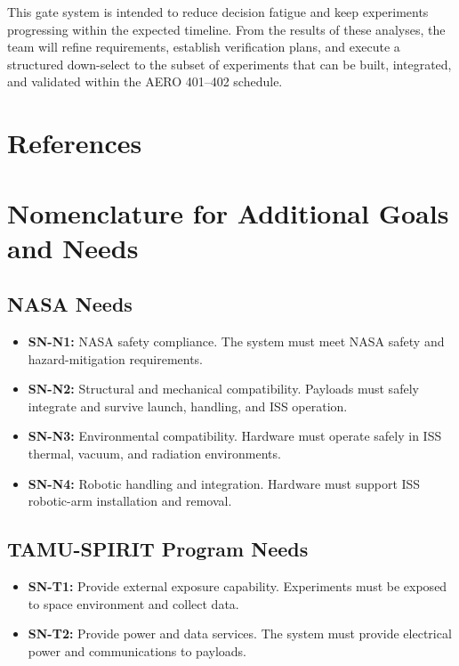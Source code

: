 \documentclass[conf]{new-aiaa}
\begin{document}
This gate system is intended to reduce decision fatigue and keep experiments progressing within the expected timeline. From the results of these analyses, the team will refine requirements, establish verification plans, and execute a structured down-select to the subset of experiments that can be built, integrated, and validated within the AERO 401--402 schedule.

\clearpage
\section{References}


\clearpage
\appendix
\section{Nomenclature for Additional Goals and Needs}

\subsection*{NASA Needs}
\begin{itemize}[leftmargin=*]
    \item \textbf{SN-N1:} NASA safety compliance. The system must meet NASA safety and hazard-mitigation requirements.
    \item \textbf{SN-N2:} Structural and mechanical compatibility. Payloads must safely integrate and survive launch, handling, and ISS operation.
    \item \textbf{SN-N3:} Environmental compatibility. Hardware must operate safely in ISS thermal, vacuum, and radiation environments.
    \item \textbf{SN-N4:} Robotic handling and integration. Hardware must support ISS robotic-arm installation and removal.
\end{itemize}

\subsection*{TAMU-SPIRIT Program Needs}
\begin{itemize}[leftmargin=*]
    \item \textbf{SN-T1:} Provide external exposure capability. Experiments must be exposed to space environment and collect data.
    \item \textbf{SN-T2:} Provide power and data services. The system must provide electrical power and communications to payloads.
\end{itemize}
\end{document}

